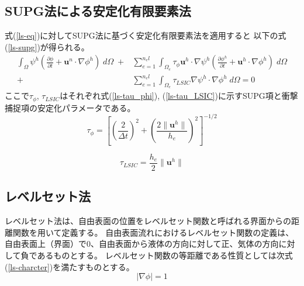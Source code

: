 \subsection{SUPG法による安定化有限要素法}
式(\ref{ls-eq})に対してSUPG法に基づく安定化有限要素法を適用すると
以下の式(\ref{ls-supg})が得られる。
\begin{equation}
\label{ls-supg}
		\begin{split}
		\int_{\Omega} \psi^{h}\left( \frac{\partial \phi}{\partial t} + \bm{u}^{n} \cdot \nabla \phi^{h} \right) \; d\Omega \;+& 
		\sum^{n_el}_{e=1} \int_{\Omega_{e}} \tau_{\phi} \bm{u}^{h} \cdot \nabla \psi^{h} \left( \frac{\partial \phi^{h}}{\partial t} + \bm{u}^{h} \cdot \nabla \phi^{h} \right) \; d\Omega \\
		+& \sum^{n_el}_{e=1} \int_{\Omega_{e}} \tau_{LSIC} \nabla \psi^{h} \cdot \nabla \phi^{h} \; d\Omega = 0
	\end{split}
\end{equation}
ここで$\tau_\phi$, $\tau_{LSIC}$はそれぞれ式(\ref{ls-tau_phi}), (\ref{ls-tau_LSIC})に示すSUPG項と衝撃捕捉項の安定化パラメータである。
\begin{equation}
\label{ls-tau_phi}
	\tau_{\phi} = \left[ \left(\frac{2}{\Delta t} \right)^2 + \left(\frac{2 \| \bm{u}^{h} \|}{h_{e}} \right)^2 \right]^{-1/2}
\end{equation}

\begin{equation}
\label{ls-tau_LSIC}
	\tau_{LSIC} = \frac{h_{e}}{2} \| \bm{u}^{h} \|
\end{equation}

\begin{comment}
\subsection{離散化(Euler後退差分)}

\begin{equation}
	\{ \bm{M} + \bm{M}_{s} \} \frac{\phi^{n+1} - \phi^{n}}{\Delta t}
	+ \{ \bm{A} + \bm{A}_{s} \} \phi^{n} 
	+ \bm{C}_{si} \phi^{n}
	= 0
\end{equation}

\subsection{離散化(Crank-Nicolson法とAdams-Bashforth法)}
\end{comment}

\subsection{レベルセット法}
レベルセット法は、自由表面の位置をレベルセット関数と呼ばれる界面からの距離関数を用いて定義する。
自由表面流れにおけるレベルセット関数の定義は、自由表面上（界面）で0、自由表面から液体の方向に対して正、気体の方向に対して負であるものとする。
レベルセット関数の等距離である性質としては次式(\ref{ls-charcter})を満たすものとする。
\begin{equation}
\label{ls-charcter}
	| \nabla \phi | = 1
\end{equation}

